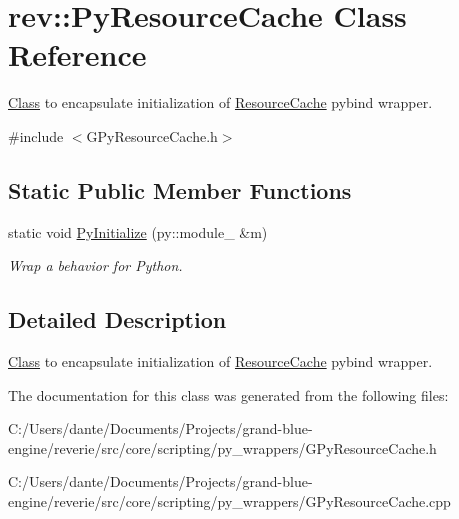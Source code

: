 \hypertarget{classrev_1_1_py_resource_cache}{}\section{rev\+::Py\+Resource\+Cache Class Reference}
\label{classrev_1_1_py_resource_cache}


\mbox{\hyperlink{struct_class}{Class}} to encapsulate initialization of \mbox{\hyperlink{classrev_1_1_resource_cache}{Resource\+Cache}} pybind wrapper.  




{\ttfamily \#include $<$G\+Py\+Resource\+Cache.\+h$>$}

\subsection*{Static Public Member Functions}
\begin{DoxyCompactItemize}
\item 
\mbox{\label{classrev_1_1_py_resource_cache_a6a013461f3fe085de29b6cd0267da654}} 
static void \mbox{\hyperlink{classrev_1_1_py_resource_cache_a6a013461f3fe085de29b6cd0267da654}{Py\+Initialize}} (py\+::module\+\_\+ \&m)
\begin{DoxyCompactList}\small\item\em Wrap a behavior for Python. \end{DoxyCompactList}\end{DoxyCompactItemize}


\subsection{Detailed Description}
\mbox{\hyperlink{struct_class}{Class}} to encapsulate initialization of \mbox{\hyperlink{classrev_1_1_resource_cache}{Resource\+Cache}} pybind wrapper. 

The documentation for this class was generated from the following files\+:\begin{DoxyCompactItemize}
\item 
C\+:/\+Users/dante/\+Documents/\+Projects/grand-\/blue-\/engine/reverie/src/core/scripting/py\+\_\+wrappers/G\+Py\+Resource\+Cache.\+h\item 
C\+:/\+Users/dante/\+Documents/\+Projects/grand-\/blue-\/engine/reverie/src/core/scripting/py\+\_\+wrappers/G\+Py\+Resource\+Cache.\+cpp\end{DoxyCompactItemize}
